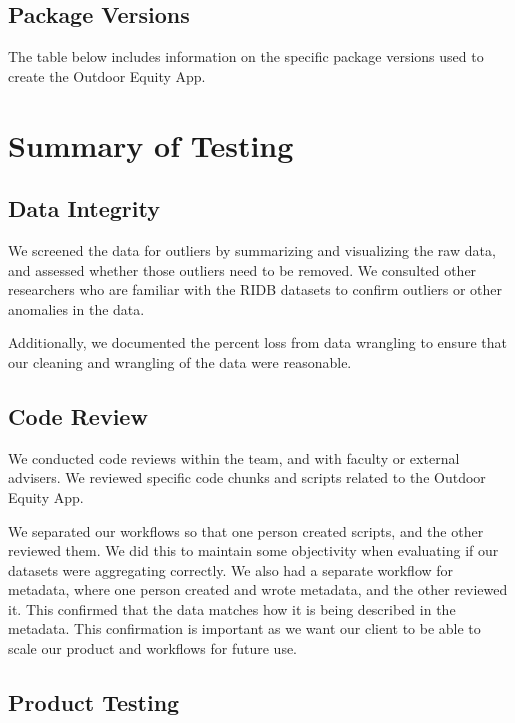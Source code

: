 \documentclass[
]{book}
\begin{document}
\hypertarget{package-versions}{%
\section{Package Versions}\label{package-versions}}

The table below includes information on the specific package versions used to create the Outdoor Equity App.

\hypertarget{summary-of-testing}{%
\chapter{Summary of Testing}\label{summary-of-testing}}

\hypertarget{data-integrity}{%
\section{Data Integrity}\label{data-integrity}}

We screened the data for outliers by summarizing and visualizing the raw data, and assessed whether those outliers need to be removed. We consulted other researchers who are familiar with the RIDB datasets to confirm outliers or other anomalies in the data.

Additionally, we documented the percent loss from data wrangling to ensure that our cleaning and wrangling of the data were reasonable.

\hypertarget{code-review}{%
\section{Code Review}\label{code-review}}

We conducted code reviews within the team, and with faculty or external advisers. We reviewed specific code chunks and scripts related to the Outdoor Equity App.

We separated our workflows so that one person created scripts, and the other reviewed them. We did this to maintain some objectivity when evaluating if our datasets were aggregating correctly. We also had a separate workflow for metadata, where one person created and wrote metadata, and the other reviewed it. This confirmed that the data matches how it is being described in the metadata. This confirmation is important as we want our client to be able to scale our product and workflows for future use.

\hypertarget{product-testing}{%
\section{Product Testing}\label{product-testing}}
\end{document}
